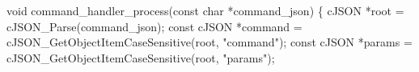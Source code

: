 \documentclass[13pt,a4paper]{extarticle}
\newenvironment{Shaded}{}{}
\newcommand{\DataTypeTok}[1]{\textcolor[rgb]{0.56,0.13,0.00}{#1}}
\newcommand{\NormalTok}[1]{#1}
\newcommand{\OperatorTok}[1]{\textcolor[rgb]{0.40,0.40,0.40}{#1}}
\newcommand{\StringTok}[1]{\textcolor[rgb]{0.25,0.44,0.63}{#1}}
\renewcommand{\\}{\thesislongtableorignewline\hline}%
\begin{document}
\begin{Shaded}
\begin{Highlighting}[]
\DataTypeTok{void}\NormalTok{ command\_handler\_process}\OperatorTok{(}\DataTypeTok{const} \DataTypeTok{char} \OperatorTok{*}\NormalTok{command\_json}\OperatorTok{)} \OperatorTok{\{}
\NormalTok{    cJSON }\OperatorTok{*}\NormalTok{root }\OperatorTok{=}\NormalTok{ cJSON\_Parse}\OperatorTok{(}\NormalTok{command\_json}\OperatorTok{);}
    \DataTypeTok{const}\NormalTok{ cJSON }\OperatorTok{*}\NormalTok{command }\OperatorTok{=}\NormalTok{ cJSON\_GetObjectItemCaseSensitive}\OperatorTok{(}\NormalTok{root}\OperatorTok{,} \StringTok{"command"}\OperatorTok{);}
    \DataTypeTok{const}\NormalTok{ cJSON }\OperatorTok{*}\NormalTok{params }\OperatorTok{=}\NormalTok{ cJSON\_GetObjectItemCaseSensitive}\OperatorTok{(}\NormalTok{root}\OperatorTok{,} \StringTok{"params"}\OperatorTok{);}


\end{Highlighting}
\end{Shaded}
\end{document}
